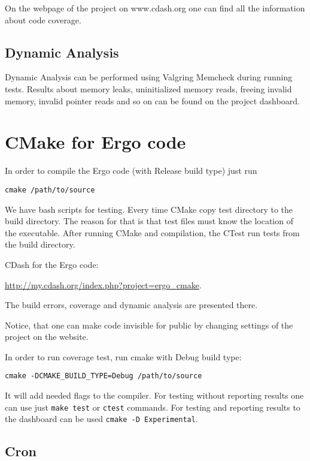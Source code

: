 \documentclass[a4paper,10pt]{article}
\begin{document}
On the webpage of the project on www.cdash.org one can find all the information about code coverage.


\subsection{Dynamic Analysis}

Dynamic Analysis can be performed using Valgring Memcheck during running tests. Results about memory leaks, uninitialized memory reads, freeing invalid memory, invalid pointer reads and so on can be found on the project dashboard.

\section{CMake for Ergo code}

In order to compile the Ergo code (with Release build type) just run
\begin{verbatim}
cmake /path/to/source
\end{verbatim}


We have bash scripts for testing. Every time CMake copy test directory to the build directory. The reason for that is that test files must know the location of the executable.
After running CMake and compilation, the CTest run tests from the build directory.

CDash for the Ergo code: 

\url{http://my.cdash.org/index.php?project=ergo_cmake}.

The build errors, coverage and dynamic analysis are presented there.  

Notice, that one can make code invisible for public by changing settings of the project on the website.

In order to run coverage test, run cmake with Debug build type: 
\begin{verbatim}
cmake -DCMAKE_BUILD_TYPE=Debug /path/to/source
\end{verbatim}
It will add needed flags to the compiler.
For testing without reporting results one can use just \texttt{make test} or \texttt{ctest} commands.
For testing and reporting results to the dashboard can be used \texttt{cmake -D Experimental}.


\subsection{Cron}
\end{document}
